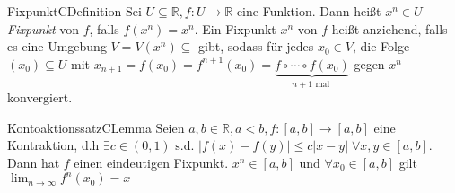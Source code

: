 \begin{ibox}[]{Fixpunkt}{CDefinition}
    Sei $ U \subseteq \mathbb{R}, f: U \to \mathbb{R}  $ eine Funktion. Dann heißt $ x^{n} \in U $ \textit{Fixpunkt} von $ f $, falls 
		$ f (x^n)  = x^{n} $. Ein Fixpunkt $ x^{n} $ von $ f $ heißt anziehend, falls es eine Umgebung $ V = V (x^n) \subseteq  $ gibt,
		sodass für jedes $ x_0 \in V $, die Folge $ (x_0) \subseteq U  $ mit $ x_{n+1} = f (x_0)  = f^{n+1} (x_0) = \underbrace{  f \circ \cdots 
		\circ f (x_0) }_{n+1 \text{ mal } }$ gegen $ x^{n} $ konvergiert. 
\end{ibox}
\begin{ibox}[]{Kontoaktionssatz}{CLemma}
    Seien $ a,b \in \mathbb{R} , a < b, f : \left[ a,b \right] \to \left[ a,b \right]  $ eine Kontraktion, d.h $ \exists c \in (0,1) 
		\text{ s.d. } \left| f (x) - f (y)  \right| \leq  c \left| x-y \right| \; \forall x,y \in \left[ a,b \right] $. Dann hat $ f $ einen
		eindeutigen Fixpunkt. $ x^{n} \in \left[ a,b \right] \text{ und } \forall x_0 \in [a,b] $ gilt $ \lim_{ n \to \infty  } f^{n} (x_0) =x $ 
\end{ibox}

%
